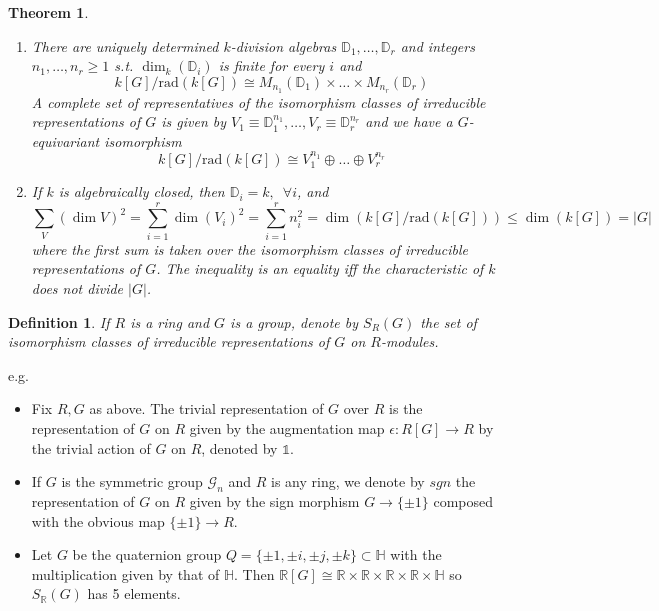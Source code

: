 \documentclass[12pt,letterpaper]{report}
\newtheorem{definition}{Definition}[section]
\newtheorem{theorem}{Theorem}[section]
\begin{document}
\begin{theorem}\begin{enumerate}\item There are uniquely determined $k$-division algebras $\mathbb{D}_{1},\dots,\mathbb{D}_{r}$ and integers $n_{1},\dots,n_{r}\geq1$ s.t. $\dim_{k}(\mathbb{D}_{i})$ is finite for every $i$ and \begin{equation*}k[G]/\text{rad}(k[G])\cong M_{n_{1}}(\mathbb{D}_{1})\times\dots\times M_{n_{r}}(\mathbb{D}_{r})\end{equation*}A complete set of representatives of the isomorphism classes of irreducible representations of $G$ is given by $V_{1}\equiv\mathbb{D}_{1}^{n_{1}},\dots,V_{r}\equiv\mathbb{D}_{r}^{n_{r}}$ and we have a $G$-equivariant isomorphism \begin{equation*}k[G]/\text{rad}(k[G])\cong V_{1}^{n_{1}}\oplus \dots\oplus V_{r}^{n_{r}}\end{equation*}\item If $k$ is algebraically closed, then $\mathbb{D}_{i}=k,\,\,\,\forall i$, and \begin{equation*}\sum_{V}(\dim V)^{2}=\sum_{i=1}^{r}\dim(V_{i})^{2}=\sum_{i=1}^{r}n_{i}^{2}=\dim(k[G]/\text{rad}(k[G]))\leq\dim(k[G])=|G|\end{equation*} where the first sum is taken over the isomorphism classes of irreducible representations of $G$. The inequality is an equality iff the characteristic of $k$ does not divide $|G|$.\end{enumerate}\end{theorem}



\begin{definition}If $R$ is a ring and $G$ is a group, denote by $S_{R}(G)$ the set of isomorphism classes of irreducible representations of $G$ on $R$-modules.\end{definition}
e.g.\begin{itemize}\item Fix $R,G$ as above. The trivial representation of $G$ over $R$ is the representation of $G$ on $R$ given by the augmentation map $\epsilon:R[G]\rightarrow R$ by the trivial action of $G$ on $R$, denoted by $\mathbb{1}$. 
\item If $G$ is the symmetric group $\mathcal{G}_{n}$ and $R$ is any ring, we denote by $sgn$ the representation of $G$ on $R$ given by the sign morphism $G\rightarrow\{\pm1\}$ composed with the obvious map $\{\pm1\}\rightarrow R.$
\item Let $G$ be the quaternion group $Q=\{\pm1,\pm i,\pm j,\pm k\}\subset\mathbb{H}$ with the multiplication given by that of $\mathbb{H}$. Then $\mathbb{R}[G]\cong \mathbb{R}\times\mathbb{R}\times\mathbb{R}\times\mathbb{R}\times\mathbb{H}$ so $S_{\mathbb{R}}(G)$ has 5 elements.  
\end{itemize}
\end{document}
